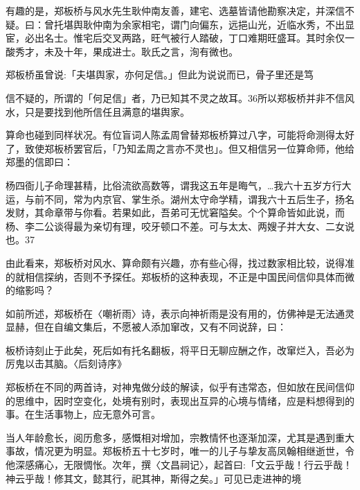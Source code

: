有趣的是，郑板桥与风水先生耿仲南友善，建宅、选墓皆请他勘察决定，并深信不疑。曰：曾托堪舆耿仲南为余家相宅，谓门向偏东，远挹山光，近临水秀，不出显宦，必出名士。惟宅后交叉两路，旺气被行人踏破，丁口难期旺盛耳。其时余仅一酸秀才，未及十年，果成进士。耿氏之言，洵有微也。

郑板桥虽曾说:「夫堪舆家，亦何足信。」但此为说说而已，骨子里还是笃


\noindent 信不疑的，所谓的「何足信」者，乃已知其不灵之故耳。36所以郑板桥并非不信风水，只是要找到他所信任且满意的堪舆家。

算命也碰到同样状况。有位盲词人陈孟周曾替郑板桥算过八字，可能将命测得太好了，致使郑板桥罢官后，「乃知孟周之言亦不灵也」。但又相信另一位算命师，他给郑墨的信即曰：

\begin{BookQuote}
杨四衙儿子命理甚精，比俗流欲高数等，谓我这五年是晦气，…我六十五岁方行大运，与前不同，常为内京官、掌生杀。湖州太守命学精，谓我六十五后生子，扬名发财，其命章带与你看。若果如此，吾弟可无忧窘隘矣。个个算命皆如此说，而杨、李二公谈得最为亲切有理，咬牙顿口不差。可与太太、两嫂子并大女、二女说也。37
\end{BookQuote}

由此看来，郑板桥对风水、算命颇有兴趣，亦有些心得，找过数家相比较，说得准的就相信探纳，否则不予探任。郑板桥的这种表现，不正是中国民间信仰具体而微的缩影吗？

如前所述，郑板桥在〈嘲祈雨〉诗，表示向神祈雨是没有用的，仿佛神是无法通灵显赫，但在自编文集后，不愿被人添加窜改，又有不同说辞，曰：

\begin{BookQuote}
板桥诗刻止于此矣，死后如有托名翻板，将平日无聊应酬之作，改窜烂入，吾必为厉鬼以击其脑。〈后刻诗序》
\end{BookQuote}

郑板桥在不同的两首诗，对神鬼做分歧的解读，似乎有违常态，但如放在民间信仰的思维中，因时空变化，处境有别时，表现出互异的心境与情绪，应是料想得到的事。在生活事物上，应无意外可言。

当人年龄愈长，阅历愈多，感慨相对增加，宗教情怀也逐渐加深，尤其是遇到重大事故，情况更为明显。郑板桥五十七岁时，唯一的儿子与挚友高凤翰相继逝世，令他深感痛心，无限惆怅。次年，撰〈文昌祠记〉，起首曰:「文云乎哉！行云乎哉！神云乎哉！修其文，懿其行，祀其神，斯得之矣。」可见已走进神的境

\vfill
\begin{BookNotes}
\end{BookNotes}

